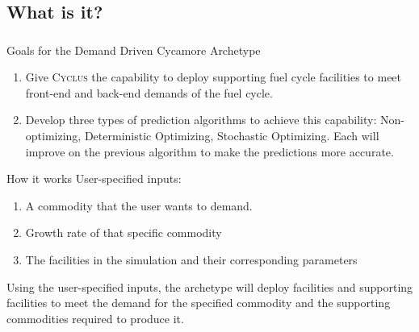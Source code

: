 \newcommand{\Cyclus}{\textsc{Cyclus}\xspace}%
\subsection{What is it?}
\begin{frame}
  \frametitle{}

\begin{block}{Goals for the Demand Driven Cycamore Archetype}
\begin{enumerate}
	\item Give \Cyclus the capability to deploy supporting fuel cycle facilities to meet front-end and back-end demands of the fuel cycle. 
	\item Develop three types of prediction algorithms to achieve this capability: Non-optimizing, Deterministic Optimizing, Stochastic Optimizing. Each will improve on the previous algorithm to make the predictions more accurate. 
\end{enumerate}
\end{block}

\begin{block}{How it works}
User-specified inputs: 
\begin{enumerate}
	\item A commodity that the user wants to demand. 
	\item Growth rate of that specific commodity 
	\item The facilities in the simulation and their corresponding parameters
\end{enumerate}
Using the user-specified inputs, the archetype will deploy facilities and supporting facilities to meet the demand for the specified commodity and the supporting commodities required to produce it. 
\end{block}


\end{frame}

